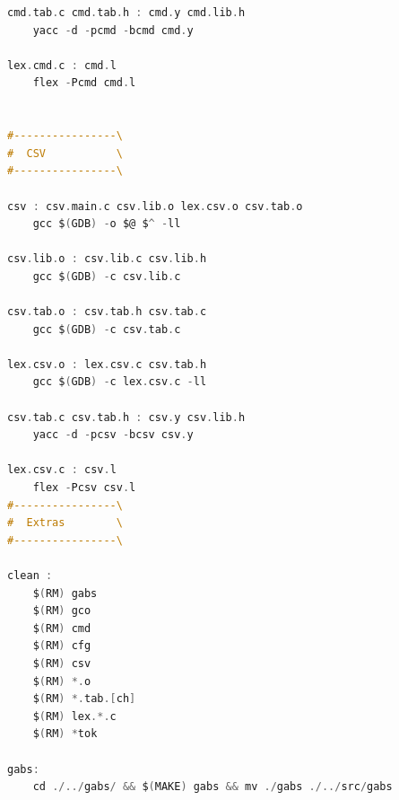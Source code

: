\documentclass[11pt, a4paper, oneside]{article}
\begin{document}
\begin{lstlisting}[language=C, caption={Makefile}]
cmd.tab.c cmd.tab.h : cmd.y cmd.lib.h
	yacc -d -pcmd -bcmd cmd.y

lex.cmd.c : cmd.l
	flex -Pcmd cmd.l


#----------------\
#  CSV           \
#----------------\

csv : csv.main.c csv.lib.o lex.csv.o csv.tab.o
	gcc $(GDB) -o $@ $^ -ll

csv.lib.o : csv.lib.c csv.lib.h
	gcc $(GDB) -c csv.lib.c

csv.tab.o : csv.tab.h csv.tab.c
	gcc $(GDB) -c csv.tab.c

lex.csv.o : lex.csv.c csv.tab.h
	gcc $(GDB) -c lex.csv.c -ll

csv.tab.c csv.tab.h : csv.y csv.lib.h
	yacc -d -pcsv -bcsv csv.y

lex.csv.c : csv.l
	flex -Pcsv csv.l
#----------------\
#  Extras        \
#----------------\

clean :
	$(RM) gabs
	$(RM) gco
	$(RM) cmd
	$(RM) cfg
	$(RM) csv
	$(RM) *.o
	$(RM) *.tab.[ch]
	$(RM) lex.*.c
	$(RM) *tok

gabs:
	cd ./../gabs/ && $(MAKE) gabs && mv ./gabs ./../src/gabs

\end{lstlisting}
\newpage
\end{document}
